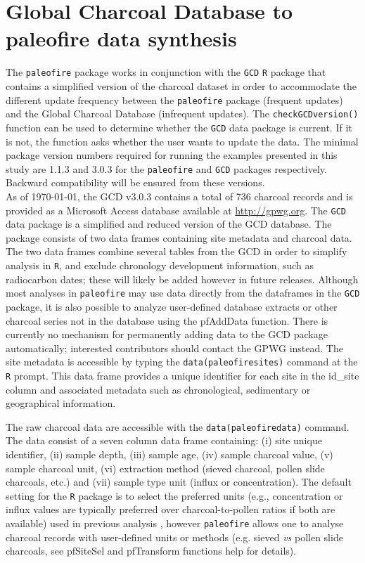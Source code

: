 \documentclass{elsarticle}
\begin{document}
\section{Global Charcoal Database to paleofire data synthesis}

The \texttt{paleofire} package works in conjunction with the \texttt{GCD} \texttt{R} package that contains a simplified version of the charcoal dataset in order to accommodate the different update frequency between the  \texttt{paleofire} package (frequent updates) and the Global Charcoal Database (infrequent updates). The \texttt{checkGCDversion()} function can be used to determine whether the \texttt{GCD} data package is current. If it is not, the function asks whether the user wants to update the data. The minimal package version numbers required for running the examples presented in this study are 1.1.3 and 3.0.3 for the \texttt{paleofire} and \texttt{GCD} packages respectively. Backward compatibility will be ensured from these versions.\\
As of \today, the GCD v3.0.3 contains a total of 736 charcoal records and is provided as a Microsoft Access database available at \url{http://gpwg.org}. The \texttt{GCD} data package is a simplified and reduced version of the GCD database. The package consists of two data frames containing site metadata and charcoal data. The two data frames combine several tables from the GCD in order to simplify analysis in \texttt{R}, and exclude chronology development information, such as radiocarbon dates; these will likely be added however in future releases.  
Although most analyses in \texttt{paleofire} may use data directly from the dataframes in the \texttt{GCD} package, it is also possible to analyze user-defined database extracts or other charcoal series not in the database using the pfAddData function. There is currently no mechanism for permanently adding data to the GCD package automatically; interested contributors should contact the GPWG instead.
The site metadata is accessible by typing the \texttt{data(paleofiresites)} command at the \texttt{R} prompt. This data frame provides a unique identifier for each site in the id\_site column and associated metadata such as chronological, sedimentary or geographical information. 

The raw charcoal data are accessible with the \texttt{data(paleofiredata)} command. The data consist of a seven column data frame containing: (i) site unique identifier, (ii) sample depth, (iii) sample age, (iv) sample charcoal value, (v) sample charcoal unit, (vi) extraction method (sieved charcoal, pollen slide charcoals, etc.) and (vii) sample type unit (influx or concentration). The default setting for the \texttt{R} package is to select the preferred units (e.g., concentration or influx values are typically preferred over charcoal-to-pollen ratios if both are available) used in previous analysis \citetext{see \citealp{Daniau2012} or \citealp{Power2008}},  however \texttt{paleofire} allows one to analyse charcoal records with user-defined units or methods (e.g. sieved \textit{vs} pollen slide charcoals, see pfSiteSel and pfTransform functions help for details).  
\end{document}
